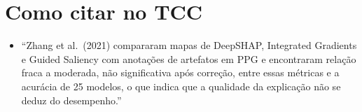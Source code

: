 \documentclass[11pt,a4paper]{article}
\begin{document}
\section{Como citar no TCC}
\begin{itemize}
\item “Zhang et al.\ (2021) compararam mapas de DeepSHAP, Integrated Gradients e Guided Saliency com anotações de artefatos em PPG e encontraram relação fraca a moderada, não significativa após correção, entre essas métricas e a acurácia de 25 modelos, o que indica que a qualidade da explicação não se deduz do desempenho.”
\end{itemize}
\end{document}
